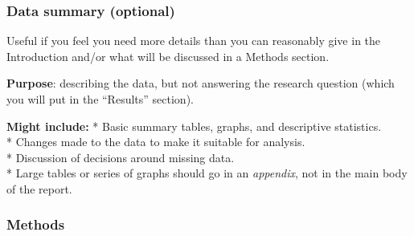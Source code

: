 \documentclass[
  openany]{book}
\begin{document}
\hypertarget{data-summary-optional}{%
\subsubsection{Data summary (optional)}\label{data-summary-optional}}

Useful if you feel you need more details than you can reasonably give in the Introduction and/or what will be discussed in a Methods section.

\textbf{Purpose}: describing the data, but not answering the research question (which you will put in the ``Results'' section).

\textbf{Might include:}
* Basic summary tables, graphs, and descriptive statistics.\\
* Changes made to the data to make it suitable for analysis.\\
* Discussion of decisions around missing data.\\
* Large tables or series of graphs should go in an \emph{appendix}, not in the main body of the report.

\hypertarget{methodsreport}{%
\subsubsection{Methods}\label{methodsreport}}
\end{document}

